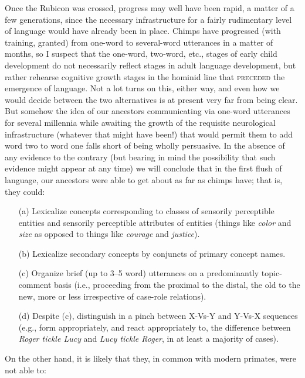 Once the Rubicon was crossed, progress may well have been rapid, a matter of a few generations, since the necessary infrastructure for a fairly rudimentary level of language would have already been in
place. Chimps have progressed (with training, granted) from one-word to several-word utterances in a matter of months, so I suspect that the one-word, two-word, etc., stages of early child development do not necessarily reflect stages in adult language development, but rather rehearse cognitive growth stages in the hominid line that \textsc{preceded} the emergence of language. Not a lot turns on this, either way, and even how we would decide between the two alternatives is at present very far from being clear. But somehow the idea of our ancestors communicating via one-word utterances for several millennia while awaiting the growth of the requisite neurological infrastructure (whatever that might have been!) that would permit them to add word two to word one falls short of being wholly persuasive. In the absence of any evidence to the contrary (but bearing in mind the possibility that such evidence might appear at any time) we will conclude that in the first flush of language, our ancestors were able to get about as far as chimps have; that is, they could:

\begin{itemize}
\item[(a)] Lexicalize concepts corresponding to classes of sensorily perceptible entities and sensorily perceptible attributes of entities (things like \textit{color} and \textit{size} as opposed to things like \textit{courage} and \textit{justice}).
\item[(b)] Lexicalize secondary concepts by conjuncts of primary concept names.
\item[(c)] Organize brief (up to 3--5 word) utterances on a predominantly topic-comment basis (i.e., proceeding from the proximal to the distal, the old to the new, more or less irrespective of case-role relations).
\item[(d)] Despite (c), distinguish in a pinch between X-Vs-Y and Y-Vs-X sequences (e.g., form appropriately, and react appropriately to, the difference between \textit{Roger tickle Lucy} and \textit{Lucy tickle Roger}, in at least a majority of cases).
\end{itemize}

On the other hand, it is likely that they, in common with modern primates, were not able to:

